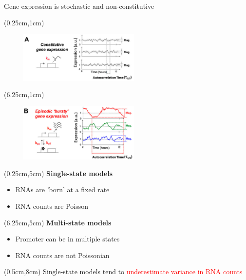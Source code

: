 \documentclass{beamer}					%
\begin{document}
\begin{frame}{Gene expression is stochastic and non-constitutive}


\begin{textblock*}{6cm}(0.25cm,1cm)
\begin{figure}
\includegraphics[width=6cm]{burst-1.png}
\end{figure}
\end{textblock*}

\begin{textblock*}{6cm}(6.25cm,1cm)
\begin{figure}
\includegraphics[width=6cm]{burst-2.png}
\end{figure}
\end{textblock*}


\begin{textblock*}{6cm}(0.25cm,5cm)
\hspace{0.5in}\textbf{Single-state models}
\begin{itemize}
\item RNAs are 'born' at a fixed rate
\item RNA counts are Poisson
\end{itemize}
\end{textblock*}

\begin{textblock*}{6cm}(6.25cm,5cm)
\hspace{0.5in}\textbf{Multi-state models}
\begin{itemize}
\item Promoter can be in multiple states
\item RNA counts are not Poissonian
\end{itemize}

\end{textblock*}

\begin{textblock*}{15cm}(0.5cm,8cm)
Single-state models tend to \textcolor{red}{underestimate variance in RNA counts}
\end{textblock*}


\end{frame}
\end{document}
